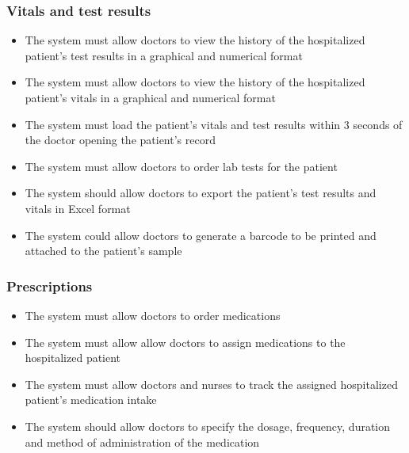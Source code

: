 \subsubsection{Vitals and test results}
\begin{itemize}
    \item The system must allow doctors to view the history of the hospitalized patient's test results in a graphical and numerical format
    \item The system must allow doctors to view the history of the hospitalized patient's vitals in a graphical and numerical format
    \item The system must load the patient's vitals and test results within 3 seconds of the doctor opening the patient's record
    \item The system must allow doctors to order lab tests for the patient
    \item The system should allow doctors to export the patient's test results and vitals in Excel format
    \item The system could allow doctors to generate a barcode to be printed and attached to the patient's sample
\end{itemize}

\subsubsection{Prescriptions}
\begin{itemize}
    \item The system must allow doctors to order medications
    \item The system must allow allow doctors to assign medications to the hospitalized patient
    \item The system must allow doctors and nurses to track the assigned hospitalized patient's medication intake
    \item The system should allow doctors to specify the dosage, frequency, duration and method of administration of the medication
\end{itemize}

